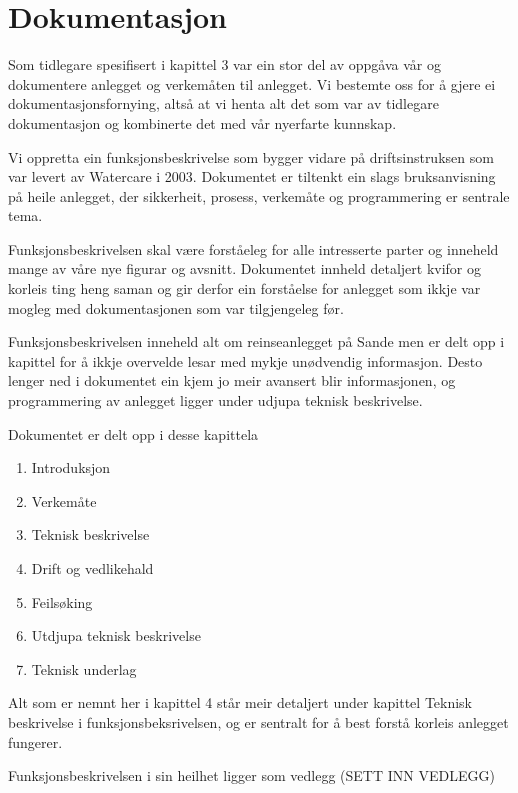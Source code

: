 \newpage
\section{Dokumentasjon}
\thispagestyle{fancy}

Som tidlegare spesifisert i kapittel 3 var ein stor del av oppgåva vår og dokumentere
anlegget og verkemåten til anlegget. Vi bestemte oss for å gjere ei dokumentasjonsfornying,
altså at vi henta alt det som var av tidlegare dokumentasjon og kombinerte det med vår nyerfarte kunnskap.

Vi oppretta ein funksjonsbeskrivelse som bygger vidare på driftsinstruksen som var levert av 
Watercare i 2003. Dokumentet er tiltenkt ein slags bruksanvisning på heile anlegget,
der sikkerheit, prosess, verkemåte og programmering er sentrale tema.

Funksjonsbeskrivelsen skal være forståeleg for alle intresserte parter og inneheld 
mange av våre nye figurar og avsnitt. Dokumentet innheld detaljert kvifor og korleis
ting heng saman og gir derfor ein forståelse for anlegget som ikkje var mogleg med dokumentasjonen som var tilgjengeleg før.

Funksjonsbeskrivelsen inneheld alt om reinseanlegget på Sande men er delt opp i kapittel for å ikkje
overvelde lesar med mykje unødvendig informasjon. Desto lenger ned i dokumentet ein kjem jo meir avansert blir informasjonen,
og programmering av anlegget ligger under udjupa teknisk beskrivelse.

Dokumentet er delt opp i desse kapittela

\begin{enumerate}
    \item Introduksjon
    \item Verkemåte
    \item Teknisk beskrivelse
    \item Drift og vedlikehald
    \item Feilsøking
    \item Utdjupa teknisk beskrivelse
    \item Teknisk underlag
\end{enumerate}

Alt som er nemnt her i kapittel 4 står meir detaljert under kapittel Teknisk beskrivelse i funksjonsbeksrivelsen, og
er sentralt for å best forstå korleis anlegget fungerer.

Funksjonsbeskrivelsen i sin heilhet ligger som vedlegg (SETT INN VEDLEGG)